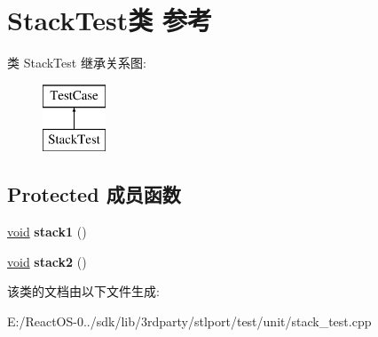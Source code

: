 \hypertarget{class_stack_test}{}\section{Stack\+Test类 参考}
\label{class_stack_test}
类 Stack\+Test 继承关系图\+:\begin{figure}[H]
\begin{center}
\leavevmode
\includegraphics[height=2.000000cm]{class_stack_test}
\end{center}
\end{figure}
\subsection*{Protected 成员函数}
\begin{DoxyCompactItemize}
\item 
\mbox{\label{class_stack_test_a2fb07970c1d394f3165e2da00f144283}} 
\hyperlink{interfacevoid}{void} {\bfseries stack1} ()
\item 
\mbox{\label{class_stack_test_a45118b47648a0e1abc4f4d761569eb05}} 
\hyperlink{interfacevoid}{void} {\bfseries stack2} ()
\end{DoxyCompactItemize}


该类的文档由以下文件生成\+:\begin{DoxyCompactItemize}
\item 
E\+:/\+React\+O\+S-\/0../sdk/lib/3rdparty/stlport/test/unit/stack\+\_\+test.\+cpp\end{DoxyCompactItemize}
